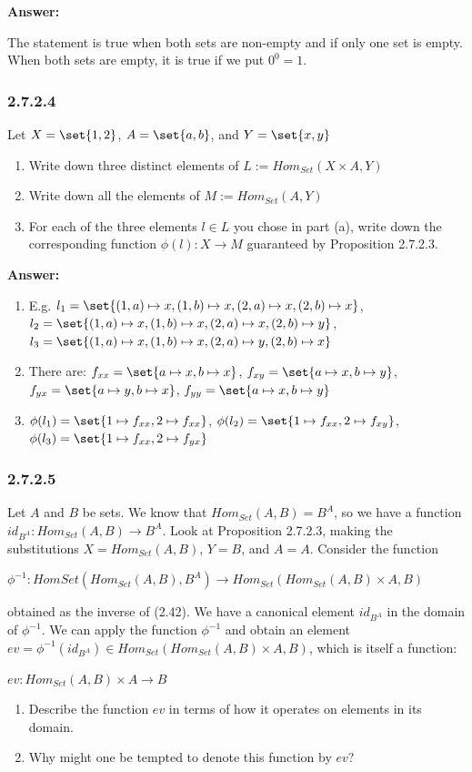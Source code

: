 \documentclass{article}
\newcommand{\vsp}[0]{\vspace*{10pt}\par}
\newcommand{\exercise}[1]{\subsubsection*{#1}}
\newcommand{\ans}[0]{\vsp\textbf{Answer: }\vsp}
\newcommand{\ei}{\item}
\newcommand{\es}{\begin{enumerate}[label=(\alph*)]\ei}
\newcommand{\ee}{\end{enumerate}}
\begin{document}
\ans

The statement is true when both sets are non-empty and if only one set is empty.
When both sets are empty, it is true if we put $0^0 = 1$.

\exercise{2.7.2.4}

Let $X = \set{1, 2}$, $A = \set{a, b}$, and $Y = \set{x, y}$

\es Write down three distinct elements of $L := Hom_{Set}(X \times A, Y)$
\ei Write down all the elements of $M := Hom_{Set}(A, Y)$
\ei For each of the three elements $l \in L$ you chose in part (a), write down
    the corresponding function $\phi(l): X \to M$ guaranteed by Proposition
    2.7.2.3.
\ee

\ans

\es E.g.
    $l_1 = \set{(1,a) \mapsto x, (1,b) \mapsto x, (2,a) \mapsto x, (2,b) \mapsto x}$,
    $l_2 = \set{(1,a) \mapsto x, (1,b) \mapsto x, (2,a) \mapsto x, (2,b) \mapsto y}$,
    $l_3 = \set{(1,a) \mapsto x, (1,b) \mapsto x, (2,a) \mapsto y, (2,b) \mapsto x}$
\ei There are:
    $f_{xx} = \set{a \mapsto x, b \mapsto x}$,
    $f_{xy} = \set{a \mapsto x, b \mapsto y}$,
    $f_{yx} = \set{a \mapsto y, b \mapsto x}$,
    $f_{yy} = \set{a \mapsto x, b \mapsto y}$
\ei $\phi(l_1) = \set{1 \mapsto f_{xx}, 2 \mapsto f_{xx}}$,
    $\phi(l_2) = \set{1 \mapsto f_{xx}, 2 \mapsto f_{xy}}$,
    $\phi(l_3) = \set{1 \mapsto f_{xx}, 2 \mapsto f_{yx}}$
\ee

\exercise{2.7.2.5}

Let $A$ and $B$ be sets.  We know that $Hom_{Set}(A, B) = B^A$, so we have a
function $id_{B^A} : Hom_{Set}(A, B) \to B^A$. Look at Proposition 2.7.2.3,
making the substitutions $X = Hom_{Set}(A, B)$, $Y = B$, and $A = A$. Consider
the function

\vsp

$\phi^{-1} : Hom{Set}(Hom_{Set}(A, B), B^A) \to Hom_{Set}(Hom_{Set}(A, B) \times A, B)$

\vsp

obtained as the inverse of (2.42).  We have a canonical element $id_{B^A}$ in
the domain of $\phi^{-1}$.  We can apply the function $\phi^{-1}$ and obtain an
element $ev = \phi^{-1}(id_{B^A}) \in Hom_{Set}(Hom_{Set}(A, B) \times A, B)$,
which is itself a function:

\vsp
$ev: Hom_{Set}(A, B) \times A \to B$
\vsp

\es Describe the function $ev$ in terms of how it operates on elements in its domain.
\ei Why might one be tempted to denote this function by $ev$?
\ee
\end{document}
